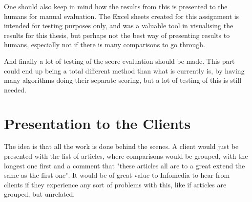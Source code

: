 One should also keep in mind how the results from this is presented to the humans for manual evaluation. The Excel sheets created for this assignment is intended for testing purposes only, and was a valuable tool in visualising the results for this thesis, but perhaps not the best way of presenting results to humans, especially not if there is many comparisons to go through.

And finally a lot of testing of the score evaluation should be made. This part could end up being a total different method than what is currently is, by having many algorithms doing their separate scoring, but a lot of testing of this is still needed.

\section{Presentation to the Clients}
The idea is that all the work is done behind the scenes. A client would just be presented with the list of articles,   where comparisons would be grouped, with the longest one first and a comment that "these articles all are to a great extend the same as the first one". It would be of great value to Infomedia to hear from clients if they experience any sort of problems with this, like if articles are grouped, but unrelated.